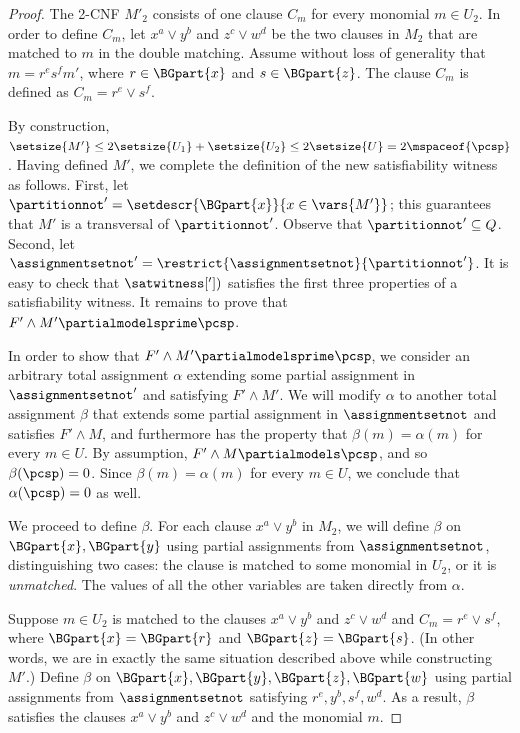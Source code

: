 \begin{proof}
The 2-CNF $M'_2$ consists of one clause $C_m$ for every monomial $m \in U_2$. In order to define $C_m$, let $x^a \lor y^b$ and $z^c \lor w^d$ be the two clauses in $M_2$ that are matched to $m$ in the double matching. Assume without loss of generality that $m = r^e s^f m'$, where $r \in \BGpart{x}$ and $s \in \BGpart{z}$. The clause $C_m$ is defined as $C_m = r^e \lor s^f$.

By construction, $\setsize{M'} \leq 2\setsize{U_1} + \setsize{U_2} \leq 2\setsize{U} = 2\mspaceof{\pcsp}$. Having defined $M'$, we complete the definition of the new satisfiability witness as follows. First, let $\partitionnot' = \setdescr{\BGpart{x}}{x\in\vars{M'}}$; this guarantees that $M'$ is a transversal of $\partitionnot'$. Observe that $\partitionnot'\subseteq{Q}$. Second, let $\assignmentsetnot'=\restrict{\assignmentsetnot}{\partitionnot'}$. It is easy to check that $\satwitness['])$ satisfies the first three properties of a satisfiability witness. It remains to prove that $F' \land M' \partialmodelsprime \pcsp$.

In order to show that $F'\land M' \partialmodelsprime \pcsp$, we consider an arbitrary total assignment $\alpha$ extending some partial assignment in $\assignmentsetnot'$ and satisfying $F' \land M'$. We will modify $\alpha$ to another total assignment $\beta$ that extends some partial assignment in $\assignmentsetnot$ and satisfies $F' \land M$, and furthermore has the property that $\beta(m) = \alpha(m)$ for every $m \in U$. By assumption, $F' \land M \partialmodels \pcsp$, and so $\beta(\pcsp) = 0$. Since $\beta(m) = \alpha(m)$ for every $m \in U$, we conclude that $\alpha(\pcsp) = 0$ as well.

We proceed to define $\beta$. For each clause $x^a \lor y^b$ in $M_2$, we will define $\beta$ on $\BGpart{x},\BGpart{y}$ using partial assignments from $\assignmentsetnot$, distinguishing two cases: the clause is matched to some monomial in $U_2$, or it is \emph{unmatched}. The values of all the other variables are taken directly from $\alpha$.

Suppose $m \in U_2$ is matched to the clauses $x^a \lor y^b$ and $z^c \lor w^d$ and $C_m = r^e \lor s^f$, where $\BGpart{x} = \BGpart{r}$ and $\BGpart{z} = \BGpart{s}$. (In other words, we are in exactly the same situation described above while constructing $M'$.) Define $\beta$ on $\BGpart{x},\BGpart{y},\BGpart{z},\BGpart{w}$ using partial assignments from $\assignmentsetnot$ satisfying $r^e,y^b,s^f,w^d$. As a result, $\beta$ satisfies the clauses $x^a \lor y^b$ and $z^c \lor w^d$ and the monomial $m$.


\end{proof}
